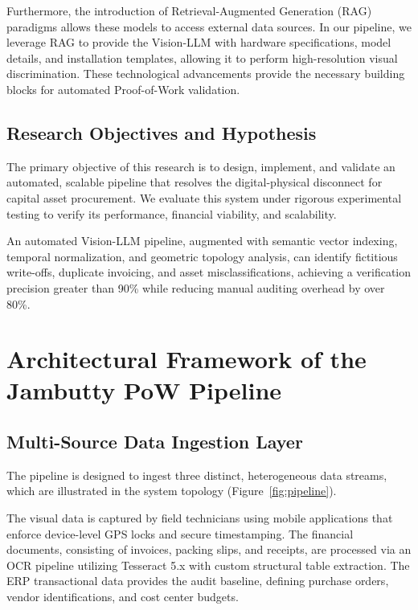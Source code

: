 \documentclass[11pt,letterpaper]{report}
\begin{document}
Furthermore, the introduction of Retrieval-Augmented Generation (RAG) paradigms allows these models to access external data sources. In our pipeline, we leverage RAG to provide the Vision-LLM with hardware specifications, model details, and installation templates, allowing it to perform high-resolution visual discrimination. These technological advancements provide the necessary building blocks for automated Proof-of-Work validation.

\section{Research Objectives and Hypothesis}

The primary objective of this research is to design, implement, and validate an automated, scalable pipeline that resolves the digital-physical disconnect for capital asset procurement. We evaluate this system under rigorous experimental testing to verify its performance, financial viability, and scalability.

\begin{hypothesis}
An automated Vision-LLM pipeline, augmented with semantic vector indexing, temporal normalization, and geometric topology analysis, can identify fictitious write-offs, duplicate invoicing, and asset misclassifications, achieving a verification precision greater than 90\% while reducing manual auditing overhead by over 80\%.
\end{hypothesis}

\chapter{Architectural Framework of the Jambutty PoW Pipeline}

\section{Multi-Source Data Ingestion Layer}

The pipeline is designed to ingest three distinct, heterogeneous data streams, which are illustrated in the system topology (Figure~\ref{fig:pipeline}).

The visual data is captured by field technicians using mobile applications that enforce device-level GPS locks and secure timestamping. The financial documents, consisting of invoices, packing slips, and receipts, are processed via an OCR pipeline utilizing Tesseract 5.x with custom structural table extraction. The ERP transactional data provides the audit baseline, defining purchase orders, vendor identifications, and cost center budgets.
\end{document}
